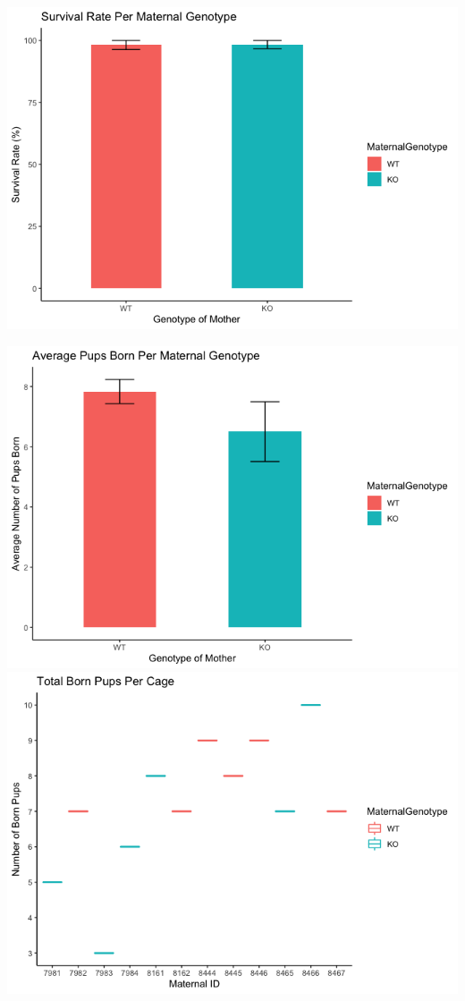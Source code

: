 \documentclass[]{article}
\begin{document}
\includegraphics{figures/atsc-survivalpergenotype-bargraph-1.png}

\includegraphics{figures/numberofpupspergenotype-1.png}
\includegraphics{figures/numberofpupspergenotype-2.png}
\end{document}
